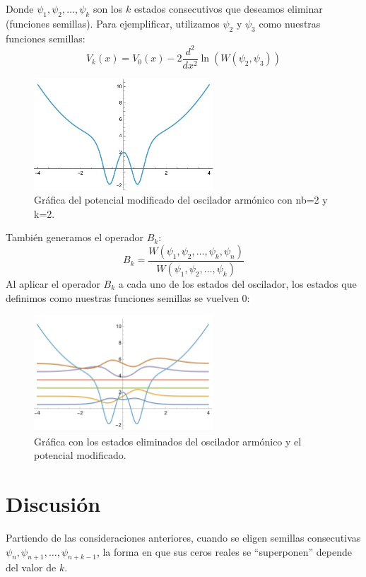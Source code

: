 \documentclass[%
 aip,
 jmp,%
 amsmath,amssymb,
 reprint,
]{revtex4-2}
\begin{document}
Donde \( \psi_1, \psi_2, \dots, \psi_k \) son los \( k \) estados consecutivos que deseamos eliminar (funciones semillas).
Para ejemplificar, utilizamos \( \psi_2 \) y \( \psi_3 \) como nuestras funciones semillas:
\begin{equation}
V_k(x) = V_0(x) - 2 \frac{d^2}{dx^2} \ln(W(\psi_2, \psi_3))
\end{equation}
\begin{figure}[H]
    \centering
    \includegraphics[width=0.6\textwidth]{QuantumHarmonicOscillator_blue_2_2.jpeg}
    \caption{Gráfica del potencial modificado del oscilador armónico con nb=2 y k=2.}
    \label{fig:modified_oscillator}
\end{figure}
También generamos el operador \( B_k \):
\begin{equation}
B_k = \frac{W(\psi_1, \psi_2, \dots, \psi_k, \psi_n)}{W(\psi_1, \psi_2, \dots, \psi_k)}
\end{equation}
Al aplicar el operador \( B_k \) a cada uno de los estados del oscilador, los estados que definimos como nuestras funciones semillas se vuelven 0:
\begin{figure}[H]
    \centering
    \includegraphics[width=0.6\textwidth]{QuantumHarmonicOscillator_2_3.jpeg}
    \caption{Gráfica con los estados eliminados del oscilador armónico y el potencial modificado.}
    \label{fig:modified_oscillator}
\end{figure}

\section{Discusión}
Partiendo de las consideraciones anteriores, cuando se eligen semillas consecutivas 
\( \psi_n, \psi_{n+1}, \dots, \psi_{n+k-1} \), la forma en que sus ceros reales se “superponen” depende del valor de \( k \). 
\end{document}
